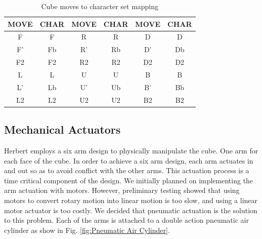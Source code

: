 \documentclass[final, letterpaper, 10 pt, conference, onecolumn]{IEEEtran}
\begin{document}
\begin{table}[!ht]
\caption{Cube moves to character set mapping}
\label{table:moves table}
\centering
\begin{tabular}{|c|c|c|c|c|c|}
\hline
\textbf{MOVE} & \textbf{CHAR} & \textbf{MOVE} & \textbf{CHAR} & \textbf{MOVE} & \textbf{CHAR} \\ \hline
F             & F              & R             & R              & D             & D             \\ \hline
F'            & Fb              & R'            & Rb              & D'            & Db            \\ \hline
F2            & F2              & R2            & R2              & D2            & D2             \\ \hline
L             & L              & U             & U             & B             & B             \\ \hline
L'            & Lb              & U'            & Ub             & B'            & Bb             \\ \hline
L2            & L2              & U2            & U2             & B2            & B2             \\ \hline
\end{tabular}
\end{table}

\subsection{Mechanical Actuators}
\label{sec:Mechanical Actuators}
Herbert employs a six arm design to physically manipulate the cube. One arm for each face of the cube. In order to achieve a six arm design, each arm actuates in and out so as to avoid conflict
with the other arms. This actuation process is a time critical component of
the design.  We initially planned on implementing the
arm actuation with motors.  However, preliminary testing showed that using
motors to convert rotary motion into linear motion is too slow, and using a linear motor
actuator is too costly. We decided that pneumatic actuation is the solution to this problem.  Each of the arms is attached to a double action pneumatic air cylinder as show in Fig. \ref{fig:Pneumatic Air Cylinder}.
\end{document}
